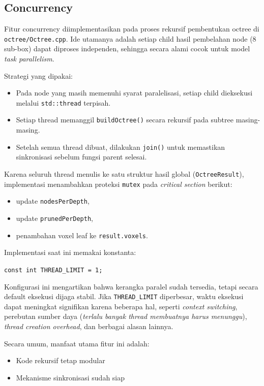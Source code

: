\documentclass[11pt,a4paper]{article}
\begin{document}
\subsection{Concurrency}
Fitur concurrency diimplementasikan pada proses rekursif pembentukan octree
di \texttt{octree/Octree.cpp}. Ide utamanya adalah setiap child hasil pembelahan
node (8 sub-box) dapat diproses independen, sehingga secara alami cocok
untuk model \textit{task parallelism}.

Strategi yang dipakai:
\begin{itemize}
    \item Pada node yang masih memenuhi syarat paralelisasi,
    setiap child dieksekusi melalui \texttt{std::thread} terpisah.
    \item Setiap thread memanggil \texttt{buildOctree()} secara rekursif
    pada subtree masing-masing.
    \item Setelah semua thread dibuat, dilakukan \texttt{join()} untuk memastikan
    sinkronisasi sebelum fungsi parent selesai.
\end{itemize}

Karena seluruh thread menulis ke satu struktur hasil global (\texttt{OctreeResult}),
implementasi menambahkan proteksi \texttt{mutex} pada \textit{critical section} berikut:
\begin{itemize}
    \item update \texttt{nodesPerDepth},
    \item update \texttt{prunedPerDepth},
    \item penambahan voxel leaf ke \texttt{result.voxels}.
\end{itemize}

Implementasi saat ini memakai konstanta:
\begin{center}
\texttt{const int THREAD\_LIMIT = 1;}
\end{center}

Konfigurasi ini mengartikan bahwa kerangka paralel sudah tersedia,
tetapi secara default eksekusi dijaga stabil.
Jika \texttt{THREAD\_LIMIT} diperbesar, waktu eksekusi dapat meningkat
signifikan karena beberapa hal, seperti \textit{context switching}, perebutan
sumber daya (\textit{terlalu banyak thread membuatnya harus menunggu}),
\textit{thread creation overhead}, dan berbagai alasan lainnya.

Secara umum, manfaat utama fitur ini adalah:
\begin{itemize}
    \item Kode rekursif tetap modular
    \item Mekanisme sinkronisasi sudah siap
\end{itemize}
\end{document}

